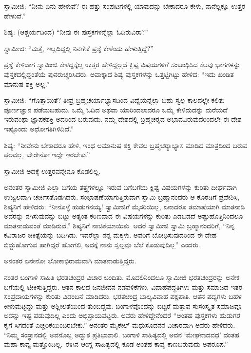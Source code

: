  ಸ್ವಾಮೀಜಿ: “ನೀನು ಏನು ಹೇಳುವೆ? ಈ ಹತ್ತು ಸಂಪುಟಗಳಲ್ಲಿ ಯಾವುದನ್ನು ಬೇಕಾದರೂ ಕೇಳು, ನಾನೆಲ್ಲಕ್ಕೂ ಉತ್ತರ ಹೇಳುವೆ.” 

 ಶಿಷ್ಯ: (ಆಶ್ಚರ್ಯದಿಂದ) “ನೀವು ಈ ಪುಸ್ತಕಗಳನ್ನೆಲ್ಲಾ ಓದಿರುವಿರಾ?” 

 ಸ್ವಾಮೀಜಿ: “ಮತ್ತೆ, ಇಲ್ಲದಿದ್ದಲ್ಲಿ ನಿನಗೇಕೆ ಪ್ರಶ್ನೆ ಕೇಳೆಂದು ಹೇಳುತ್ತಿದ್ದೆ?” 

 ಪ್ರಶ್ನೆ ಕೇಳಿದಾಗ ಸ್ವಾಮೀಜಿ ಕೇಳಿದ್ದಕ್ಕೆಲ್ಲ ಉತ್ತರ ಹೇಳಿದ್ದಲ್ಲದೆ ಕ್ಲಿಷ್ಟ ವಿಷಯಗಳಿಗೆ ಸಂಬಂಧಿಸಿದ ಕೆಲವು ಭಾಗಗಳನ್ನು ಪುಸ್ತಕದಲ್ಲಿದ್ದಂತೆಯೆ ಪುನರುಚ್ಚರಿಸಿದರು. ಅವಾಕ್ಕಾದ ಶಿಷ್ಯ ಪುಸ್ತಕಗಳನ್ನು ಒತ್ತಟ್ಟಿಗಿಟ್ಟು ಹೇಳಿದ: “ಇದು ಖಂಡಿತ ಮಾನುಷ ಶಕ್ತಿ ಅಲ್ಲ.” 

 ಸ್ವಾಮೀಜಿ: “ಗೊತ್ತಾಯಿತೆ? ತೀವ್ರ ಬ್ರಹ್ಮಚರ್ಯಾಭ್ಯಾಸದಿಂದ ವಿದ್ಯೆಯನ್ನೆಲ್ಲಾ ಬಹು ಸ್ವಲ್ಪ ಕಾಲದಲ್ಲೇ ಕಲಿತು ಪೂರ್ಣಜ್ಞಾನ ಪಡೆಯಬಹುದು. ಒಮ್ಮೆ ಓದಿದ ಅಥವಾ ಯಾರಿಂದಲಾದರೂ ಒಮ್ಮೆ ಕೇಳಿದುದನ್ನು ಮರೆಯದೆ ಇರುವಂಥಾ ಜ್ಞಾಪಕಶಕ್ತಿ ಅದರಿಂದ ಬರುವುದು. ನಮ್ಮ ದೇಶದಲ್ಲಿ ಬ್ರಹ್ಮಚರ‍್ಯದ ಅಭಾವವಿರುವುದರಿಂದಲೇ ಈ ದೇಶ ಇಷ್ಟೊಂದು ಅಧೋಗತಿಗಿಳಿದಿದೆ.” 

 ಶಿಷ್ಯ: “ನೀವೇನು ಬೇಕಾದರೂ ಹೇಳಿ, ಇಂಥ ಅಮಾನುಷ ಶಕ್ತಿ ಕೇವಲ ಬ್ರಹ್ಮಚರ‍್ಯಾಭ್ಯಾಸ ಮಾಡಿದ ಮಾತ್ರದಿಂದ ಬರುವ ಫಲವಲ್ಲ. ಬೇರೇನೋ ಇದ್ದೇ ಇರಬೇಕು.” 

 ಸ್ವಾಮೀಜಿ ಅದಕ್ಕೆ ಉತ್ತರವನ್ನೇನೂ ಕೊಡಲಿಲ್ಲ. 

 ಅನಂತರ ಸ್ವಾಮೀಜಿ ಎಲ್ಲಾ ಬಗೆಯ ತತ್ತ್ವಗಳಲ್ಲೂ ಇರುವ ಬಗೆಬಗೆಯ ಕ್ಲಿಷ್ಟ ವಿಷಯಗಳನ್ನು ಕುರಿತು ದೀರ್ಘವಾಗಿ ಉಜ್ವಲವಾಗಿ ಚರ್ಚಿಸತೊಡಗಿದರು. ಸಂಭಾಷಣೆಯಾಗುತ್ತಿರುವಾಗ ಸ್ವಾಮಿ ಬ್ರಹ್ಮಾನಂದರು ಆ ಕೊಠಡಿಗೆ ಪ್ರವೇಶಿಸಿ, ಶಿಷ್ಯನಿಗೆ ಹೇಳಿದರು: “ನೀನೊಳ್ಳೆ ಹುಡುಗನಯ್ಯ! ಸ್ವಾಮೀಜಿಗೆ ಮೈಸರಿಯಿಲ್ಲ, ಏನಾದರೂ ತಮಾಷೆಯಾಗಿ ಮಾತನಾಡಿ ಅವರನ್ನು ನಗಿಸುವುದನ್ನು ಬಿಟ್ಟು ಅತ್ಯಂತ ಕಠಿಣವಾದ ಈ ವಿಷಯಗಳನ್ನು ಕುರಿತು ಎಡಬಿಡದೆ ಅಷ್ಟುಹೊತ್ತಿನಿಂದಲೂ ಮಾತನಾಡುವಂತೆ ಮಾಡಿರುವೆ.” ಶಿಷ್ಯನಿಗೆ ನಾಚಿಕೆಯಾಯಿತು. ಆದರೆ ಸ್ವಾಮೀಜಿ ಸ್ವಾಮಿ ಬ್ರಹ್ಮಾನಂದರಿಗೆ, “ನಿನ್ನ ಕವಿರಾಜರ ಚಿಕಿತ್ಸೆಯನ್ನು ಬದಿಗಿಡು. ಇವರೆಲ್ಲಾ ನನ್ನ ಮಕ್ಕಳು. ಅವರಿಗೆ ಬೋಧಿಸುವುದರಿಂದ ಈ ದೇಹ ಬಿದ್ದುಹೋಗುವ ಹಾಗಿದ್ದರೆ ಹೋಗಲಿ, ಅದಕ್ಕೆ ನಾನು ಸ್ವಲ್ಪವೂ ಬೆಲೆ ಕೊಡುವುದಿಲ್ಲ” ಎಂದರು. 

 ಅನಂತರ ಏನೇನೋ ಲೋಕಾಭಿರಾಮವಾಗಿ ಮಾತನಾಡುತ್ತಿದ್ದರು. 

 ನಂತರ ಬಂಗಾಳಿ ಸಾಹಿತಿ ಭರತಚಂದ್ರರ ವಿಚಾರ ಬಂದಿತು. ಮೊದಲಿನಿಂದಲೂ ಸ್ವಾಮೀಜಿ ಭರತಚಂದ್ರರನ್ನು ಅನೇಕ ಬಗೆಯಲ್ಲಿ ಟೀಕಿಸುತ್ತಿದ್ದರು. ಆತನ ಕಾಲದ ಜನಜೀವನ ನಡವಳಿಕೆಗಳು, ವಿವಾಹಪದ್ಧತಿಗಳು ಮತ್ತು ಸಮಾಜದ ಇತರ ಸಂಪ್ರದಾಯಗಳನ್ನು ಕುರಿತು ವಿಡಂಬನೆ ಮಾಡಿದರು. ಭರತಚಂದ್ರ ಬಾಲ್ಯವಿವಾಹ ಪಕ್ಷಪಾತಿ. ಆತನ ಪದ್ಯಗಳು ಬಹಳ ಕೀಳುಮಟ್ಟದ್ದು ಮತ್ತು ಅಶ್ಲೀಲತೆಯಿಂದ ತುಂಬಿದ್ದವು. ಬಂಗಾಳವೊಂದನ್ನು ಬಿಟ್ಟರೆ ಮತ್ತಾವ ಸುಸಂಸ್ಕೃತ ಸಮಾಜವೂ ಅದನ್ನು ಇಷ್ಟ ಪಡುವುದಿಲ್ಲ ಎಂದು ಅಭಿಪ್ರಾಯಪಟ್ಟರು. ಅವರು ಹೇಳಿದ್ದೇನೆಂದರೆ “ಅಂತಹ ಪುಸ್ತಕಗಳು ಹುಡುಗರ ಕೈಗೆ ಸಿಗದಂತೆ ಎಚ್ಚರಿಕೆಯಿಂದಿರಬೇಕು.” ಅನಂತರ ಮೈಕೇಲ್ ಮಧುಸೂದನನ ವಿಚಾರವಾಗಿ ಅವರು ಹೇಳಿದರು. “ನಿಮ್ಮ ಸಂಸ್ಥಾನದಲ್ಲಿ ಅವನೊಬ್ಬ ಅದ್ಭುತ ಪ್ರತಿಭಾಶಾಲಿ. ಬಂಗಾಳಿ ಸಾಹಿತ್ಯದಲ್ಲಿ ಅವನ ‘ಮೇಘನಾದವಧ’ ದಂತಹ ಮಹಾ ಕಾವ್ಯ ಮತ್ತೊಂದಿಲ್ಲ. ಈಗಿನ ಆಂಗ್ಲ ಸಾಹಿತ್ಯದಲ್ಲಿ ಕೂಡ ಅಂತಹ ಕಾವ್ಯ ಕಾಣಬರುವುದು ಅಪರೂಪ.” 

